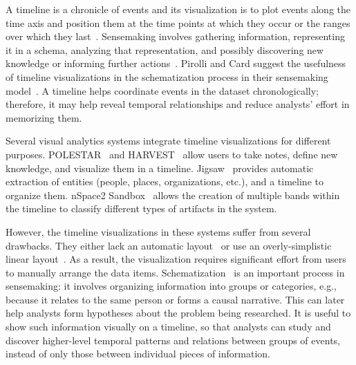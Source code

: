 A timeline is a chronicle of events and its visualization is to plot events along the time axis and position them at the time points at which they occur or the ranges over which they last~\cite{Plaisant1996a}. 
Sensemaking involves gathering information, representing it in a schema, analyzing that representation, and possibly discovering new knowledge or informing further actions~\cite{Card1999}. 
Pirolli and Card suggest the usefulness of timeline visualizations in the schematization process in their sensemaking model~\cite{Pirolli2005}. A timeline helps coordinate events in the dataset chronologically; therefore, it may help reveal temporal relationships and reduce analysts' effort in memorizing them.

 Several visual analytics systems integrate timeline visualizations for different purposes. POLESTAR~\cite{Pioch2006} and HARVEST~\cite{Gotz2006} allow users to take notes, define new knowledge, and visualize them in a timeline. Jigsaw~\cite{Gorg2013} provides automatic extraction of entities (people, places, organizations, etc.), and a timeline to organize them. nSpace2 Sandbox~\cite{SandboxTimeline2012} allows the creation of multiple bands within the timeline to classify different types of artifacts in the system.

However, the timeline visualizations in these systems suffer from several drawbacks. They either lack an automatic layout~\cite{Pioch2006} or use an overly-simplistic linear layout~\cite{SandboxTimeline2012}. As a result, the visualization requires significant effort from users to manually arrange the data items.  
Schematization~\cite{Pirolli2005} is an important process in sensemaking: it involves organizing information into groups or categories, e.g., because it relates to the same person or forms a causal narrative. This can later help analysts form hypotheses about the problem being researched. It is useful to show such information visually on a timeline, so that analysts can study and discover higher-level temporal patterns and relations between groups of events, instead of only those between individual pieces of information. 

